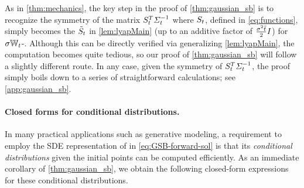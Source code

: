 As in \cref{thm:mechanics}, the key step in the proof of \cref{thm:gaussian_sb} is to recognize the symmetry of the matrix $S_{t}^T  \Sigma^{-1}_{ t }$ where $S_{t}$, defined in \eqref{eq:functions}, simply becomes the $\tilde{S}_{t}$ in \cref{lem:lyapMain} (up to an additive factor of $\frac{\sigma^2\bar{t}}{2}I$) for $\sigma\mathbb{W}_{t}$-. Although this can be directly verified via generalizing \cref{lem:lyapMain}, the computation becomes quite tedious, so our proof of \cref{thm:gaussian_sb} will follow a slightly different route. In any case, given the symmetry of $S_{t}^T  \Sigma^{-1}_{ t }$, the proof simply boils down to a series of straightforward calculations; see \cref{app:gaussian_sb}.

\paragraph{Closed forms for conditional distributions.}
In many practical applications such as generative modeling, a requirement to employ the \acrshort{SDE} representation of  in \eqref{eq:GSB-forward-sol} is that its \emph{conditional distributions} given the initial points can be computed efficiently. As an immediate corollary of \cref{thm:gaussian_sb}, we obtain the following closed-form expressions for these conditional distributions.

